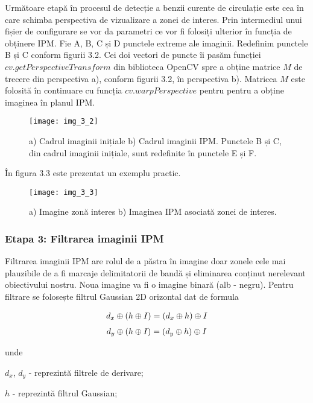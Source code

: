 Următoare etapă în procesul de detecție a benzii curente de circulație este cea în care schimba perspectiva de vizualizare a zonei de interes. Prin intermediul unui fișier de configurare se vor da parametri ce vor fi folosiți ulterior în funcția de obținere IPM. Fie A, B, C și D punctele extreme ale imaginii. Redefinim punctele B și C conform figurii 3.2. Cei doi vectori de puncte îi pasăm funcției $cv.getPerspectiveTransform$ din biblioteca OpenCV spre a obține matrice $M$ de trecere din perspectiva a), conform figurii 3.2, în perspectiva b). Matricea $M$ este folosită în continuare cu funcția $cv.warpPerspective$ pentru pentru a obține imaginea în planul IPM.
\begin{figure}[!h]
	\centering
	\texttt{[image: img\_3\_2]}
	\caption[Transformare IPM]{a) Cadrul imaginii inițiale b) Cadrul imaginii IPM. Punctele B și C, din cadrul imaginii inițiale, sunt redefinite în punctele E și F.}
\end{figure}

În figura 3.3 este prezentat un exemplu practic.
\begin{figure}[!h]
	\centering
	\texttt{[image: img\_3\_3]}
	\caption[Transformare IPM în practică]{a) Imagine zonă interes b) Imaginea IPM asociată zonei de interes.}
\end{figure}


\subsubsection*{Etapa 3: Filtrarea imaginii IPM}

Filtrarea imaginii IPM are rolul de a păstra în imagine doar zonele cele mai plauzibile de a fi marcaje delimitatorii de bandă și eliminarea conținut nerelevant obiectivului nostru. Noua imagine va fi o imagine binară (alb - negru). Pentru filtrare se folosește filtrul Gaussian 2D orizontal dat de formula

\begin{align}
	d_x \mathbin{\oplus} (h \mathbin{\oplus} I) = (d_x \mathbin{\oplus} h) \mathbin{\oplus} I
\end{align}
\begin{align}
	d_y \mathbin{\oplus} (h \mathbin{\oplus} I) = (d_y \mathbin{\oplus} h) \mathbin{\oplus} I
\end{align}

unde

$d_x$, $d_y$ - reprezintă filtrele de derivare;

$h$ - reprezintă filtrul Gaussian;

